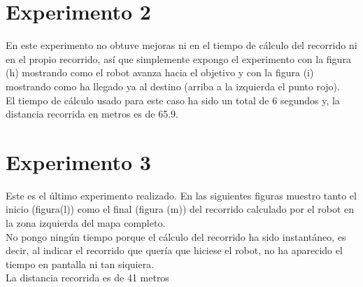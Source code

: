\newpage


\section{Experimento 2}

En este experimento no obtuve mejoras ni en el tiempo de cálculo del recorrido ni en el propio recorrido, así que simplemente expongo el experimento con la figura (h) mostrando como el robot avanza hacia el objetivo y con la figura (i) mostrando como ha llegado ya al destino (arriba a la izquierda el punto rojo).\\

El tiempo de cálculo usado para este caso ha sido un total de 6 segundos y, la distancia recorrida en metros es de 65.9.

\begin{figure}[H] %
	\centering
	
\end{figure}
\newpage

\section{Experimento 3}

Este es el último experimento realizado. En las siguientes figuras muestro tanto el inicio (figura(l)) como el final (figura (m)) del recorrido calculado por el robot en la zona izquierda del mapa completo. \\
No pongo ningún tiempo porque el cálculo del recorrido ha sido instantáneo, es decir, al indicar el recorrido que quería que hiciese el robot, no ha aparecido el tiempo en pantalla ni tan siquiera. \\
La distancia recorrida es de 41 metros

\begin{figure}[H] %
	\centering
\end{figure}






